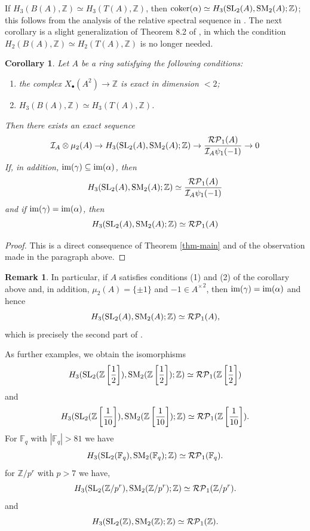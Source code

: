 \documentclass[11pt]{amsart}
\theoremstyle{definition}
\theoremstyle{plain}
\newtheorem{cor}[ntn]{Corollary}
\theoremstyle{definition}
\newtheorem{rem}[ntn]{Remark}
\numberwithin{equation}{section}
\newcommand{\z}{\mathbb{Z}}
\newcommand{\F}{\mathbb{F}}
\newcommand{\II}{\mathcal{I}}
\newcommand{\RP}{\mathcal{RP}}
\renewcommand{\aa}{{A^\times}}
\newcommand{\mth}[1]{\left[ \frac{1}{#1} \right]}
\newcommand{\SL}{\mathit{{\rm SL}}}
\newcommand{\SM}{\mathit{{\rm SM}}}
\newcommand{\im}{{\rm im}}
\newcommand{\coker}{{\rm coker}}
\begin{document}
	If $H_3(B(A),\z)\simeq H_3(T(A),\z)$, then $\coker(\alpha)\simeq H_3(\SL_2(A),\SM_2(A);\z)$; this follows from the analysis of the relative spectral sequence in \cite[\S 8]{B-E--2023}. The next corollary is a slight generalization of Theorem 8.2 of \cite{B-E--2023}, in which the condition $H_2(B(A),\z)\simeq H_2(T(A),\z)$ is no longer needed.
	\begin{cor}
		Let $A$ be a ring satisfying the following conditions:
		\begin{enumerate}
			\item the complex $X_{\bullet}(A^2)\to\z$ is exact in dimension $<2$;
			\item $H_3(B(A),\z)\simeq H_3(T(A),\z)$.
		\end{enumerate}
		Then there exists an exact sequence
		\[
		\II_A\otimes\mu_2(A)\to H_3(\SL_2(A),\SM_2(A);\z)\to \frac{\RP_1(A)}{\II_A\psi_1(-1)}\to 0
		\]
		If, in addition, $\im(\gamma)\subseteq\im(\alpha)$, then
		\[
		H_3(\SL_2(A),\SM_2(A);\z)\simeq\frac{\RP_1(A)}{\II_A\psi_1(-1)}
		\]
		and if $\im(\gamma)=\im(\alpha)$, then
		\[
		H_3(\SL_2(A),\SM_2(A);\z)\simeq\RP_1(A)
		\]
	\end{cor}
	\begin{proof}
		This is a direct consequence of Theorem \ref{thm-main} and of the observation made in the paragraph above.
	\end{proof}
	\begin{rem}
		In particular, if $A$ satisfies conditions (1) and (2) of the corollary above and, in addition, $\mu_2(A)=\{\pm 1\}$ and $-1\in\aa^2$, then $\im(\gamma)=\im(\alpha)$ and hence
		\[
		H_3(\SL_2(A),\SM_2(A);\z)\simeq \RP_1(A),
		\]
		which is precisely the second part of \cite[Theorem 8.2]{B-E--2023}. 
	\end{rem}
	As further examples, we obtain the isomorphisms
	\[
	H_3(\SL_2(\z\mth{2}),\SM_2(\z\mth{2});\z)\simeq \RP_1(\z\mth{2})
	\]
	and
	\[   
	H_3(\SL_2(\z\mth{10}),\SM_2(\z\mth{10});\z)\simeq \RP_1(\z\mth{10}).
	\]
	For $\F_q$ with $|\F_q|>81$ we have
	\[
	H_3(\SL_2(\F_q),\SM_2(\F_q);\z)\simeq \RP_1(\F_q).
	\]
	for $\z/p^r$ with $p>7$ we have,
	\[
	H_3(\SL_2(\z/p^r),\SM_2(\z/p^r);\z)\simeq \RP_1(\z/p^r).
	\]
	and
	\[
	H_3(\SL_2(\z),\SM_2(\z);\z)\simeq \RP_1(\z).
	\]
\end{document}
